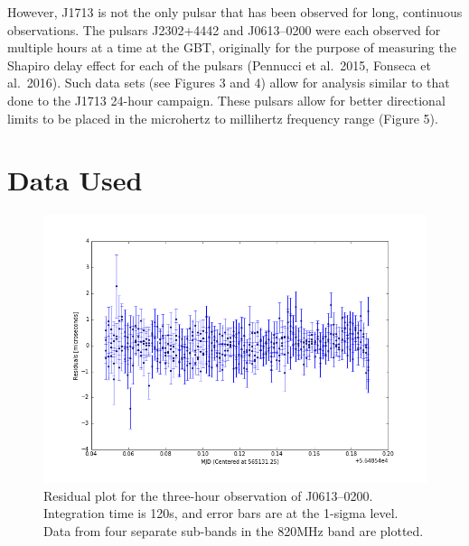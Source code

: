 \documentclass[12pt]{article}
\begin{document}
  However, J1713 is not the only pulsar that has been observed for long,
continuous observations. The pulsars J2302+4442 and J0613--0200 were each observed for
multiple hours at a time at the GBT, originally for the purpose of measuring the Shapiro
delay effect for each of the pulsars (Pennucci et al.~2015, Fonseca et al.~2016). Such data sets (see Figures 3 and 4) allow for analysis similar
to that done to the J1713 24-hour campaign. These pulsars allow for better
directional limits to be placed in the microhertz to millihertz frequency range (Figure 5).

\section{Data Used}
 
\begin{figure}[h!]
    \caption{Residual plot for the three-hour observation of J0613--0200.
Integration time is 120s, and error bars are at the 1-sigma level. Data from
four separate sub-bands in the 820MHz band are plotted.}
    \includegraphics[width=\textwidth]{./figures/J0613_residuals.png}
\end{figure}
\end{document}
